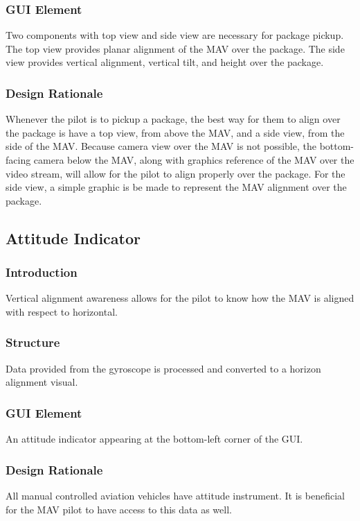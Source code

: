 \documentclass[onecolumn, draftclsnofoot, 10pt, compsoc]{IEEEtran}
\begin{document}
\subsubsection{GUI Element}
Two components with top view and side view are necessary for package pickup. The top view provides planar alignment of the MAV over the package. The side view provides vertical alignment, vertical tilt, and height over the package.

\subsubsection{Design Rationale}
Whenever the pilot is to pickup a package, the best way for them to align over the package is have a top view, from above the MAV, and a side view, from the side of the MAV. Because camera view over the MAV is not possible, the bottom-facing camera below the MAV, along with graphics reference of the MAV over the video stream, will allow for the pilot to align properly over the package. For the side view, a simple graphic is be made to represent the MAV alignment over the package.

\subsection{Attitude Indicator}
\subsubsection{Introduction}
Vertical alignment awareness allows for the pilot to know how the MAV is aligned with respect to horizontal.

\subsubsection{Structure}
Data provided from the gyroscope is processed and converted to a horizon alignment visual.

\subsubsection{GUI Element}
An attitude indicator appearing at the bottom-left corner of the GUI.

\subsubsection{Design Rationale}
All manual controlled aviation vehicles have attitude instrument. It is beneficial for the MAV pilot to have access to this data as well.
\end{document}
